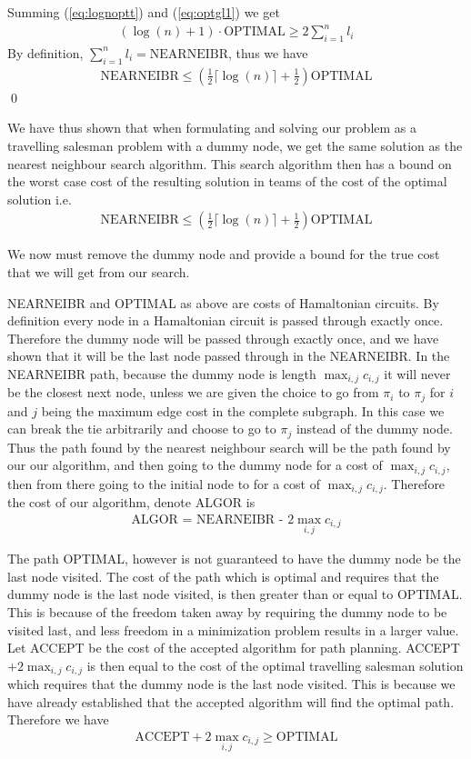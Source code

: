 Summing (\ref{eq:lognoptt}) and (\ref{eq:optgl1}) we get 
\begin{align*}
(\log(n)+1) \cdot \text{OPTIMAL} \geq 2 \sum_{i=1}^n l_i
\end{align*}
By definition, $\sum_{i=1}^n l_i = \text{NEARNEIBR}$, thus we have 
\begin{align*}
\text{NEARNEIBR} \leq (\frac{1}{2} \lceil \log(n) \rceil + \frac{1}{2}) \text{OPTIMAL}
\end{align*}
\qed 

We have thus shown that when formulating and solving our problem as a travelling salesman problem with a dummy node, we get the same solution as the nearest neighbour search algorithm. This search algorithm then has a bound on the worst case cost of the resulting solution in teams of the cost of the optimal solution i.e.\ 
\begin{align*}
\text{NEARNEIBR} \leq (\frac{1}{2} \lceil \log(n) \rceil + \frac{1}{2}) \text{OPTIMAL}
\end{align*}

We now must remove the dummy node and provide a bound for the true cost that we will get from our search. 

NEARNEIBR and OPTIMAL as above are costs of Hamaltonian circuits. By definition every node in a Hamaltonian circuit is passed through exactly once. Therefore the dummy node will be passed through exactly once, and we have shown that it will be the last node passed through in the NEARNEIBR. In the NEARNEIBR path, because the dummy node is length $\max_{i,j} c_{i,j}$ it will never be the closest next node, unless we are given the choice to go from $\pi_i$ to $\pi_j$ for $i$ and $j$ being the maximum edge cost in the complete subgraph. In this case we can break the tie arbitrarily and choose to go to $\pi_j$ instead of the dummy node. Thus the path found by the nearest neighbour search will be the path found by our our algorithm, and then going to the dummy node for a cost of $\max_{i,j} c_{i,j}$, then from there going to the initial node to for a cost of $\max_{i,j} c_{i,j}$. Therefore the cost of our algorithm, denote ALGOR is 
\begin{align*}
\text{ALGOR = NEARNEIBR - } 2\max_{i,j} c_{i,j} 
\end{align*}

The path OPTIMAL, however is not guaranteed to have the dummy node be the last node visited. The cost of the path which is optimal and requires that the dummy node is the last node visited, is then greater than or equal to OPTIMAL. This is because of the freedom taken away by requiring the dummy node to be visited last, and less freedom in a minimization problem results in a larger value. Let ACCEPT be the cost of the accepted algorithm for path planning. ACCEPT $+ 2\max_{i,j} c_{i,j}$ is then equal to the cost of the optimal travelling salesman solution which requires that the dummy node is the last node visited. This is because we have already established that the accepted algorithm will find the optimal path. Therefore we have
\begin{align*}
\text{ACCEPT} + 2\max_{i,j} c_{i,j} \geq \text{OPTIMAL}
\end{align*}

